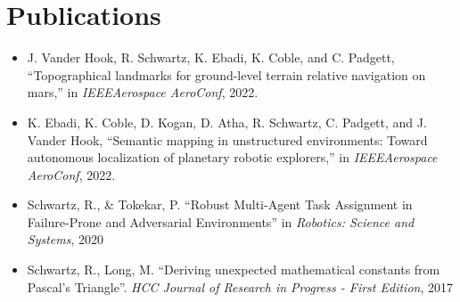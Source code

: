 \documentclass[letterpaper,11pt]{article}
\makeatletter
\newcommand{\resumeItem}[1]{
  \item\small{
    {#1 \vspace{-2pt}}
  }
}
\newcommand{\resumeProjectHeading}[2]{
    \item
    \begin{tabular*}{0.97\textwidth}{l@{\extracolsep{\fill}}r}
      \small#1 & #2 \\
    \end{tabular*}\vspace{-7pt}
}
\newcommand{\resumeSubHeadingListStart}{\begin{itemize}[leftmargin=0.15in, label={}]}
\newcommand{\resumeSubHeadingListEnd}{\end{itemize}}
\newcommand{\resumeItemListStart}{\begin{itemize}}
\newcommand{\resumeItemListEnd}{\end{itemize}}
\makeatother
\begin{document}



\section{Publications}
\small{
    \begin{itemize}
        \item J. Vander Hook, R. Schwartz, K. Ebadi, K. Coble, and C. Padgett, ``Topographical landmarks for ground-level terrain relative navigation on mars,'' in \textit{IEEEAerospace AeroConf}, 2022.

        \item K. Ebadi, K. Coble, D. Kogan, D. Atha, R. Schwartz, C. Padgett, and J. Vander Hook, ``Semantic  mapping in unstructured environments:  Toward autonomous localization of planetary robotic explorers,'' in \textit{IEEEAerospace AeroConf}, 2022.

        \item Schwartz, R., \& Tokekar, P. ``Robust Multi-Agent Task Assignment in Failure-Prone and Adversarial Environments'' in \textit{Robotics: Science and Systems}, 2020

        \item Schwartz, R., Long, M. ``Deriving unexpected mathematical constants from Pascal's Triangle''. \textit{HCC Journal of Research in Progress - First Edition}, 2017
    \end{itemize}
    
}
\end{document}
